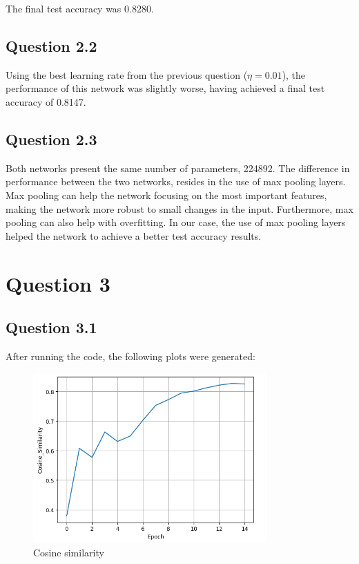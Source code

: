 \documentclass{article}
\begin{document}
The final test accuracy was 0.8280.

\subsection{Question 2.2}
Using the best learning rate from the previous question ($\eta=0.01$), the performance of this network was slightly worse,
having achieved a final test accuracy of 0.8147.

\subsection{Question 2.3}
Both networks present the same number of parameters, 224892.
The difference in performance between the two networks, resides in the use 
of max pooling layers. Max pooling can help the network focusing on the most
important features, making the network more robust to small changes in the
input. Furthermore, max pooling can also help with overfitting. In our case, 
the use of max pooling layers helped the network to achieve a better test 
accuracy results.

\section{Question 3}

\subsection{Question 3.1}
After running the code, the following plots were generated:

\begin{figure}[H]
    \centering
    \includegraphics[width=0.8\textwidth]{../report/plots/RNN-cosine-similarity.png}
    \caption{Cosine similarity}
    \label{fig:rnn-cosine-similarity}
\end{figure}
\end{document}
